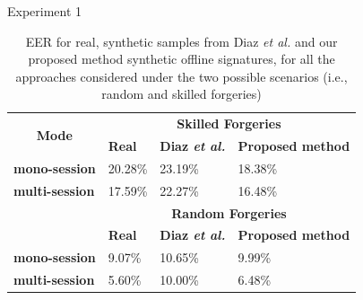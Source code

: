 \documentclass{beamer}
\begin{document}
\begin{frame}{Experiment 1}
\begin{table}[!htb]
\renewcommand{\arraystretch}{1.3}
\caption{EER for real, synthetic samples from Diaz \textit{et al.} \cite{diaz2014generation} and our proposed method synthetic offline signatures, for all the approaches considered under the two possible scenarios (i.e., random and skilled forgeries)}
\label{exp1_results_table}
\centering
\begin{tabular}{|l|l|l|l|}
    \hline
    \multicolumn{1}{|c|}{\multirow{2}{*}{\textbf{Mode}}} & \multicolumn{3}{c|}{\textbf{Skilled Forgeries}}          \\ \cline{2-4} 
    \multicolumn{1}{|c|}{}                               & \textbf{Real} & \textbf{Diaz \textit{et al.}} & \textbf{Proposed method} \\ \hline
    \textbf{mono-session}                                & 20.28\%            & 23.19\%            & 18.38\%                       \\ \hline
    \textbf{multi-session}                               & 17.59\%            & 22.27\%            & 16.48\%                       \\ \hline
    \multirow{2}{*}{}                                    & \multicolumn{3}{c|}{\textbf{Random Forgeries}}           \\ \cline{2-4} 
    & \textbf{Real} & \textbf{Diaz \textit{et al.}} & \textbf{Proposed method} \\ \hline
    \textbf{mono-session}                                & 9.07\%            & 10.65\%            & 9.99\%                       \\ \hline
    \textbf{multi-session}                               & 5.60\%            & 10.00\%            & 6.48\%                       \\ \hline
\end{tabular}

\end{table}
\end{frame}
\end{document}
